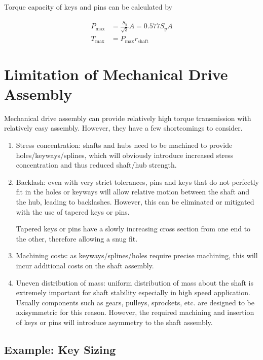 \documentclass[a4paper,openany]{tufte-book}
\begin{document}
Torque capacity of keys and pins can be calculated by

\begin{align*}
  P_{\max} &= \frac{S_{y}}{\sqrt{3}}A = 0.577 S_{y}A \\
  T_{\max} &= P_{\max}r_{\text{shaft}}
\end{align*}

\section{Limitation of Mechanical Drive Assembly}
\label{sec:org8d0d5b2}

Mechanical drive assembly can provide relatively high torque transmission with relatively easy assembly. However, they have a few shortcomings to consider.

\begin{enumerate}
\item Stress concentration: shafts and hubs need to be machined to provide holes/keyways/splines, which will obviously introduce increased stress concentration and thus reduced shaft/hub strength.

\item Backlash: even with very strict tolerances, pins and keys that do not perfectly fit in the holes or keyways will allow relative motion between the shaft and the hub, leading to backlashes. However, this can be eliminated or mitigated with the use of tapered keys or pins.

Tapered keys or pins have a slowly increasing cross section from one end to the other, therefore allowing a snug fit.

\item Machining costs: as keyways/splines/holes require precise machining, this will incur additional costs on the shaft assembly.

\item Uneven distribution of mass: uniform distribution of mass about the shaft is extremely important for shaft stability especially in high speed application. Usually components such as gears, pulleys, sprockets, etc. are designed to be axisymmetric for this reason. However, the required machining and insertion of keys or pins will introduce asymmetry to the shaft assembly.
\end{enumerate}

\subsection{Example: Key Sizing}
\label{sec:orgf50d543}
\end{document}
